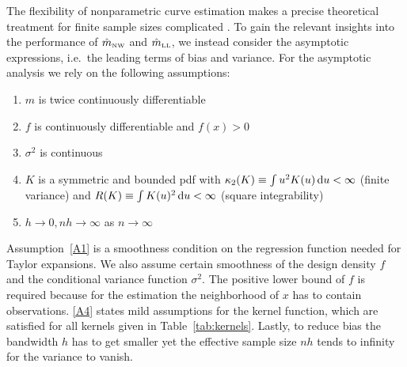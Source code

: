 The flexibility of nonparametric curve estimation makes a precise theoretical treatment for finite sample sizes complicated \parencite[15]{Härdle_1990}.
To gain the relevant insights into the performance of $\hat{m}_{\textup{\tiny NW}}$ and $\hat{m}_{\textup{\tiny LL}}$, we instead consider the asymptotic expressions,
i.e.\ the leading terms of bias and variance.
For the asymptotic analysis we rely on the following assumptions:
\begin{enumerate}[label=(A\arabic*), left=\parindent, itemsep=0pt]
	\item $m$ is twice continuously differentiable \label{A1}
	\item $f$ is continuously differentiable and $f(x)>0$
	\item $\sigma^2$ is continuous 
	\item $K$ is a symmetric and bounded pdf with $\kappa_2(K) \equiv \int u^2K(u) \mathop{}\!\textup{d} u < \infty$ (finite variance) and $R(K) \equiv \int K(u)^2 \mathop{}\!\textup{d} u < \infty$ (square integrability) \label{A4}
	\item $h \rightarrow 0, nh \rightarrow \infty$ as $n \rightarrow \infty$ \label{A5}
\end{enumerate}   
Assumption~\ref{A1} is a smoothness condition on the regression function needed for Taylor expansions.
We also assume certain smoothness of the design density $f$ and the conditional variance function $\sigma^2$.
The positive lower bound of $f$ is required because for the estimation the neighborhood of $x$ has to contain observations.
\ref{A4} states mild assumptions for the kernel function, which are satisfied for all kernels given in Table~\ref{tab:kernels}.
Lastly, to reduce bias the bandwidth $h$ has to get smaller yet the effective sample size $nh$ tends to infinity for the variance to vanish.

